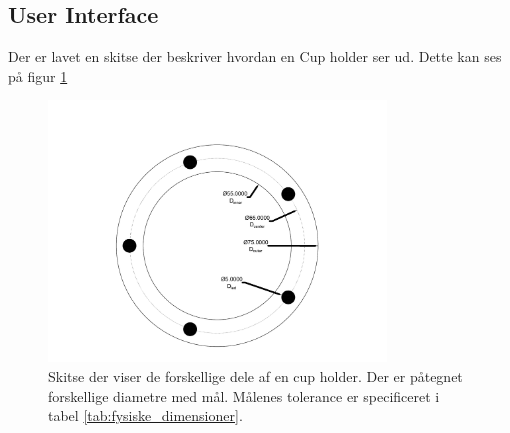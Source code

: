 \documentclass[Kravspecifikation/Kravspec_Main.tex]{subfiles}
\begin{document}
\subsection{User Interface}
Der er lavet en skitse der beskriver hvordan en Cup holder ser ud. Dette kan ses på figur \ref{fig:LEDplacement}

\begin{figure}[H]
    \centering
    \includegraphics[width=0.8\textwidth,trim={2in 0.4in 2in 1.3in},clip, page=1]{Kravspecifikation/Ikke-funktionelle/graphics/LEDplacement.pdf}
    \caption{Skitse der viser de forskellige dele af en cup holder. Der er påtegnet forskellige diametre med mål. Målenes tolerance er specificeret i tabel \ref{tab:fysiske_dimensioner}.}
    \label{fig:LEDplacement}
\end{figure}
\end{document}
